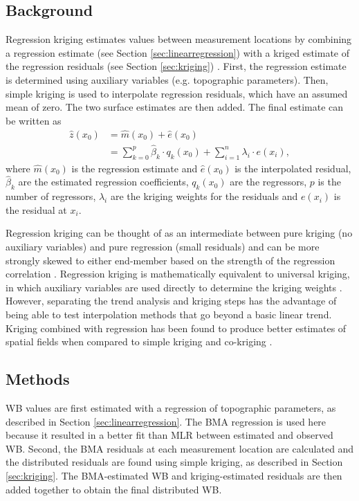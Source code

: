 \documentclass{sfuthesis}
\begin{document}
\subsection{Background}

Regression kriging estimates values between measurement locations by combining a regression estimate (see Section \ref{sec:linearregression}) with a kriged estimate of the regression residuals (see Section \ref{sec:kriging}) \citep{Hengl2007}. First, the regression estimate is determined using auxiliary variables (e.g. topographic parameters). Then, simple kriging is used to interpolate regression residuals, which have an assumed mean of zero. The two surface estimates are then added. The final estimate can be written as 
\begin{align}
\hat{z}(x_0) &= \hat{m}(x_0) + \hat{e}(x_0)\\
& = \sum^p_{k=0}\hat{\beta}_k \cdot	q_k(x_0)+ \sum_{i=1}^{n} \lambda_i \cdot e(x_i),
\end{align}
where $\hat{m}(x_0)$ is the regression estimate and $\hat{e}(x_0)$ is the interpolated residual, $\hat{\beta}_k$ are the estimated regression coefficients, $q_k(x_0)$ are the regressors, $p$ is the number of regressors, $\lambda_i$ are the kriging weights for the residuals and $e(x_i)$ is the residual at $x_i$.

Regression kriging can be thought of as an intermediate between pure kriging (no auxiliary variables) and pure regression (small residuals) and can be more strongly skewed to either end-member based on the strength of the regression correlation \citep{Hengl2007}. Regression kriging is mathematically equivalent to universal kriging, in which auxiliary variables are used directly to determine the kriging weights \citep{Hengl2007}. However, separating the trend analysis and kriging steps has the advantage of being able to test interpolation methods that go beyond a basic linear trend. Kriging combined with regression has been found to produce better estimates of spatial fields when compared to simple kriging and co-kriging \citep[e.g.][]{Knotters1995}.

\subsection{Methods}

WB values are first estimated with a regression of topographic parameters, as described in Section \ref{sec:linearregression}. The BMA regression is used here because it resulted in a better fit than MLR between estimated and observed WB. Second, the BMA residuals at each measurement location are calculated and the distributed residuals are found using simple kriging, as described in Section \ref{sec:kriging}. The BMA-estimated  WB and kriging-estimated residuals are then added together to obtain the final distributed WB. 
\end{document}
